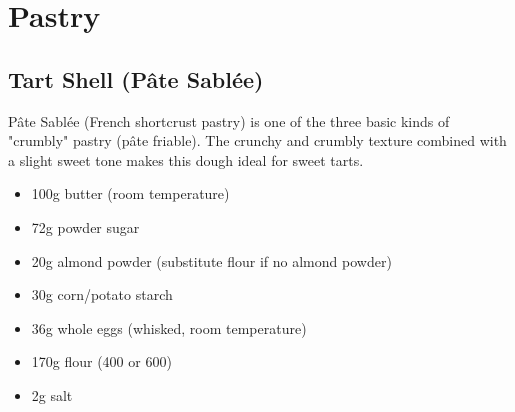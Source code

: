 \chapter{Pastry}
\section{Tart Shell (Pâte Sablée)} \label{pate-sablee} \label{tart-shell}
Pâte Sablée (French shortcrust pastry) is one of the three basic kinds of
"crumbly" pastry (pâte friable). The crunchy and crumbly texture combined with
a slight sweet tone makes this dough ideal for sweet tarts.

\begin{itemize}
  \item 100g butter (room temperature)
  \item 72g powder sugar
  \item 20g almond powder (substitute flour if no almond powder)
  \item 30g corn/potato starch
  \item 36g whole eggs (whisked, room temperature)
  \item 170g flour (400 or 600)
  \item 2g salt
\end{itemize}

